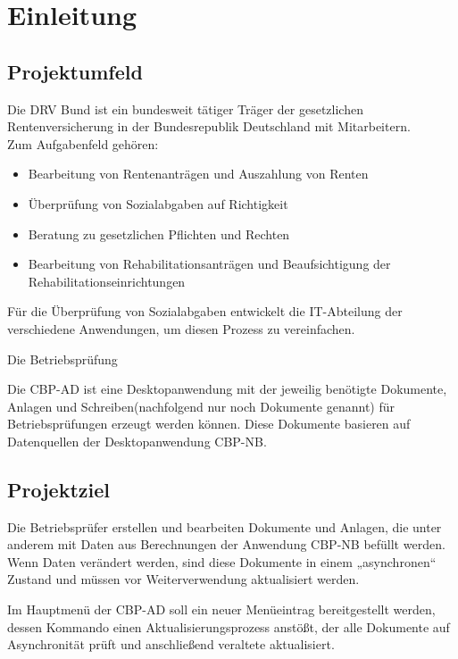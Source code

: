 
\section{Einleitung}
\label{sec:Einleitung}


\subsection{Projektumfeld} 
\label{sec:Projektumfeld}

Die \ac{DRV Bund} ist ein bundesweit tätiger Träger der gesetzlichen Rentenversicherung in der Bundesrepublik Deutschland
mit  Mitarbeitern.\\
Zum Aufgabenfeld gehören:
\begin{itemize}
	\item Bearbeitung von Rentenanträgen und Auszahlung von Renten
	\item Überprüfung von Sozialabgaben auf Richtigkeit
	\item Beratung zu gesetzlichen Pflichten und Rechten
	\item Bearbeitung von Rehabilitationsanträgen und Beaufsichtigung der Rehabilitationseinrichtungen
\end{itemize}

Für die Überprüfung von Sozialabgaben entwickelt die IT-Abteilung der \DRV verschiedene Anwendungen, um diesen Prozess zu vereinfachen.

Die Betriebsprüfung

Die \ac{CBP-AD} ist eine Desktopanwendung mit der jeweilig benötigte Dokumente, Anlagen und Schreiben(nachfolgend nur noch Dokumente genannt) für Betriebsprüfungen erzeugt werden können. Diese Dokumente basieren auf Datenquellen der Desktopanwendung \ac{CBP-NB}.


\subsection{Projektziel} 
\label{sec:Projektziel}

Die Betriebsprüfer erstellen und bearbeiten Dokumente und Anlagen, die unter anderem mit Daten aus Berechnungen der Anwendung \acs{CBP-NB} befüllt werden. Wenn Daten verändert werden, sind diese Dokumente in einem „asynchronen“ Zustand und müssen vor Weiterverwendung aktualisiert werden.

Im Hauptmenü der \acs{CBP-AD} soll ein neuer Menüeintrag bereitgestellt werden, dessen Kommando einen Aktualisierungsprozess anstößt, der alle Dokumente auf Asynchronität prüft und anschließend veraltete aktualisiert.

